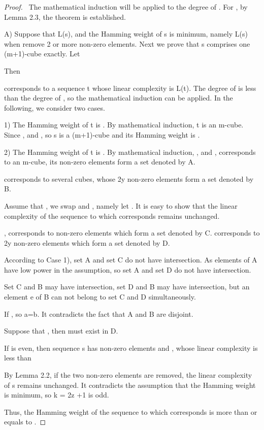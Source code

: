 \documentclass[10pt,conference,twocolumn]{IEEEtran}
\begin{document}
\begin{proof}\
The mathematical induction will be applied to the degree  of
. For , by Lemma 2.3, the theorem is established.

A) Suppose that
L(s), and the
Hamming weight of s is minimum, namely
L(s) when
remove 2 or more non-zero elements. Next we prove that s comprises
one (m+1)-cube exactly. Let



Then

corresponds to a sequence t whose linear complexity is
L(t). The degree of 
is less than the degree of , so the mathematical induction
can be applied. In the following, we consider two cases.

1) The Hamming weight of t is . By mathematical induction, t is
an m-cube. Since  , and  , so s is a (m+1)-cube and its Hamming
weight is .

2)  The Hamming weight of t is . By mathematical induction,
,
and
,
corresponds to an m-cube, its non-zero elements form a set denoted
by A.


corresponds to several cubes, whose 2y non-zero elements form a set
denoted by B.

Assume that  , we swap  and
, namely let  . It
is easy to show that the linear complexity of the sequence to which
 corresponds remains unchanged.

,
 corresponds to  non-zero elements which
form a set denoted by C.  corresponds to 2y
non-zero elements which form a set denoted by D.

According to Case 1), set A and set C do not have intersection. As
elements of A have low power in the assumption, so set A and set D
do not have intersection.

Set C and B may have intersection, set D and B may have
intersection, but an element e of B can not belong to set C and D
simultaneously.

If , so a=b. It contradicts the fact that A and B are
disjoint.

Suppose that , then
 must exist in D.

If  is even, then sequence s has non-zero elements  and
, whose linear complexity is less than

By Lemma 2.2, if the two non-zero elements are removed, the linear
complexity of s remains unchanged. It contradicts the assumption
that the Hamming weight is minimum, so k = 2z +1 is odd.

Thus, the Hamming weight of the sequence to which 
corresponds is more than or equals to  .


\end{proof}
\end{document}
